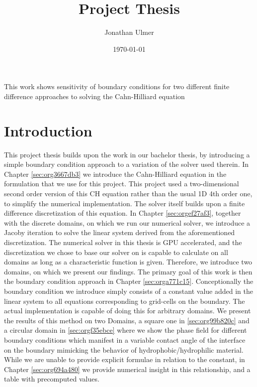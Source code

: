 \documentclass{mimosis}
\author{Jonathan Ulmer}
\date{\today}
\title{Project Thesis}
\newenvironment{abstract} {}{}
\begin{document}
\maketitle
\setcounter{tocdepth}{1}
\tableofcontents

\begin{abstract}
This work shows sensitivity of boundary conditions for two different finite difference approaches to solving the Cahn-Hilliard equation
\end{abstract}
\chapter{Introduction}
\label{sec:orgdb960fe}
This project thesis builds upon the work in our bachelor thesis, by introducing a simple boundary condition approach to a variation of the solver used therein. In Chapter \ref{sec:org3667db3} we introduce the Cahn-Hilliard equation in the formulation that we use for this project. This project used a two-dimensional second order version of this CH equation rather than the usual 1D 4th order one, to simplify the numerical implementation. The solver itself builds upon a finite difference discretization of this equation. In Chapter \ref{sec:orgef27af3}, together with the discrete domains, on which we run our numerical solver, we introduce a Jacoby iteration to solve the linear system derived from the aforementioned discretization.  The numerical solver in this thesis is GPU accelerated, and the discretization we chose to base our solver on is capable to calculate on all domains as long as a characteristic function is given. Therefore, we introduce two domains, on which we present our findings. The primary goal of this work is then the boundary condition approach in Chapter \ref{sec:orga771c15}. Conceptionally the boundary condition we introduce simply consists of a constant value added in the linear system to all equations corresponding to grid-cells on the boundary. The actual implementation is capable of doing this for arbitrary domains. We present the results of this method on two Domains, a square one in \ref{sec:org99b820c} and a circular domain in \ref{sec:orgf35ebce} where we show the phase field for different boundary conditions which manifest in a variable contact angle of the interface on the boundary mimicking the behavior of hydrophobic/hydrophilic material. While we are unable to provide explicit formulae in relation to the constant, in Chapter \ref{sec:org694a480} we provide numerical insight in this relationship, and a table with precomputed values.
\end{document}
